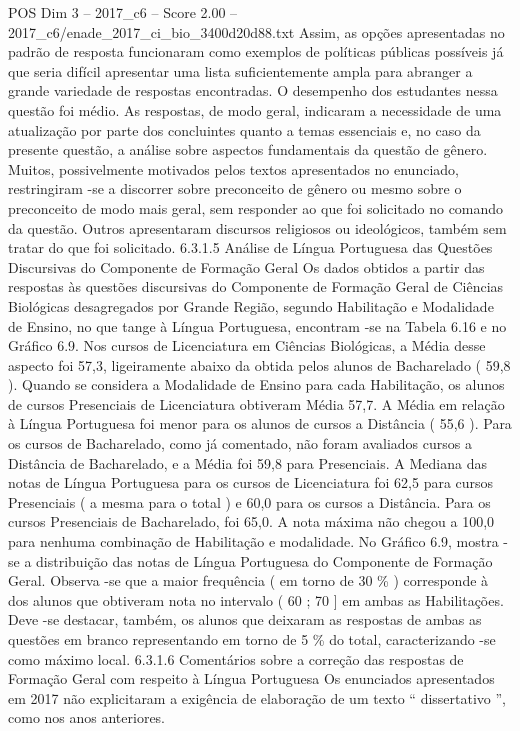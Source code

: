\begin{textsample}{POS Dim 3 – 2017\_c6 – Score 2.00 – 2017\_c6/enade\_2017\_ci\_bio\_3400d20d88.txt}
Assim, as opções apresentadas no padrão de resposta funcionaram como exemplos de políticas públicas possíveis já que seria difícil apresentar uma lista suficientemente ampla para abranger a grande variedade de respostas encontradas.
O desempenho dos estudantes nessa questão foi médio.
As respostas, de modo geral, indicaram a necessidade de uma atualização por parte dos concluintes quanto a temas essenciais e, no caso da presente questão, a análise sobre aspectos fundamentais da questão de gênero.
Muitos, possivelmente motivados pelos textos apresentados no enunciado, restringiram -se a discorrer sobre preconceito de gênero ou mesmo sobre o preconceito de modo mais geral, sem responder ao que foi solicitado no comando da questão.
Outros apresentaram discursos religiosos ou ideológicos, também sem tratar do que foi solicitado. 6.3.1.5 Análise de Língua Portuguesa das Questões Discursivas do Componente de Formação Geral Os dados obtidos a partir das respostas às questões discursivas do Componente de Formação Geral de Ciências Biológicas desagregados por Grande Região, segundo Habilitação e Modalidade de Ensino, no que tange à Língua Portuguesa, encontram -se na Tabela 6.16 e no Gráfico 6.9.
Nos cursos de Licenciatura em Ciências Biológicas, a Média desse aspecto foi 57,3, ligeiramente abaixo da obtida pelos alunos de Bacharelado ( 59,8 ).
Quando se considera a Modalidade de Ensino para cada Habilitação, os alunos de cursos Presenciais de Licenciatura obtiveram Média 57,7.
A Média em relação à Língua Portuguesa foi menor para os alunos de cursos a Distância ( 55,6 ).
Para os cursos de Bacharelado, como já comentado, não foram avaliados cursos a Distância de Bacharelado, e a Média foi 59,8 para Presenciais.
A Mediana das notas de Língua Portuguesa para os cursos de Licenciatura foi 62,5 para cursos Presenciais ( a mesma para o total ) e 60,0 para os cursos a Distância.
Para os cursos Presenciais de Bacharelado, foi 65,0.
A nota máxima não chegou a 100,0 para nenhuma combinação de Habilitação e modalidade.
No Gráfico 6.9, mostra -se a distribuição das notas de Língua Portuguesa do Componente de Formação Geral.
Observa -se que a maior frequência ( em torno de 30 \% ) corresponde à dos alunos que obtiveram nota no intervalo ( 60 ; 70 ] em ambas as Habilitações.
Deve -se destacar, também, os alunos que deixaram as respostas de ambas as questões em branco representando em torno de 5 \% do total, caracterizando -se como máximo local. 6.3.1.6 Comentários sobre a correção das respostas de Formação Geral com respeito à Língua Portuguesa Os enunciados apresentados em 2017 não explicitaram a exigência de elaboração de um texto “ dissertativo ”, como nos anos anteriores.

\end{textsample}
